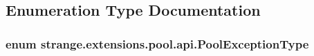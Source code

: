 \subsection{Enumeration Type Documentation}
\hypertarget{namespacestrange_1_1extensions_1_1pool_1_1api_a93ccdd4d6e731ba8a31a774428edec32}{
\subsubsection[{Pool\-Exception\-Type}]{\setlength{\rightskip}{0pt plus 5cm}enum {\bf strange.\-extensions.\-pool.\-api.\-Pool\-Exception\-Type}}}\label{namespacestrange_1_1extensions_1_1pool_1_1api_a93ccdd4d6e731ba8a31a774428edec32}
